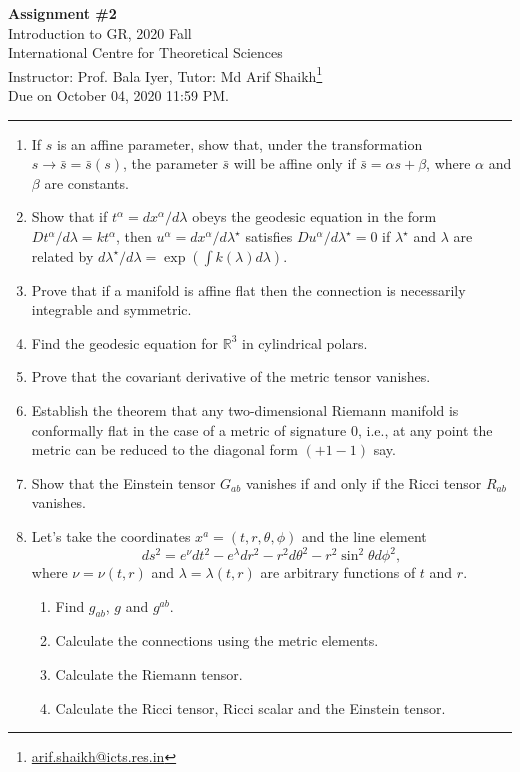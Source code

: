\documentclass{article}
\begin{document}
\begin{center}
  {\bfseries Assignment \#2}\\
  Introduction to GR, 2020 Fall\\
  International Centre for Theoretical Sciences\\
  Instructor: Prof. Bala Iyer, Tutor: Md Arif Shaikh\footnote{\href{mailto: arif.shaikh@icts.res.in}{arif.shaikh@icts.res.in}}\\
  Due on October 04, 2020 11:59 PM.
\end{center}
\hrule

\begin{enumerate}
\item If $s$ is an affine parameter, show that, under the transformation $s\to \bar{s} = \bar{s}(s)$, the parameter $\bar{s}$ will be affine only if $\bar{s} = \alpha s + \beta$, where $\alpha$ and $\beta$ are constants.

\item Show that if $t^\alpha = dx^\alpha/d\lambda$ obeys the geodesic equation in the form $Dt^\alpha/d\lambda = kt^\alpha$, then $u^\alpha = dx^\alpha/d\lambda^\star$ satisfies $Du^\alpha/d\lambda^\star = 0$ if $\lambda^\star$ and $\lambda$ are related by $d\lambda^\star/d\lambda = \exp(\int k (\lambda) d\lambda)$.

\item Prove that if a manifold is affine  flat then the connection is necessarily integrable and symmetric.

\item Find the geodesic equation for $\mathbb{R}^3$ in cylindrical polars.

\item Prove that the covariant derivative of the metric tensor vanishes.

\item Establish the theorem that any two-dimensional Riemann  manifold is conformally flat in the case of a metric of signature 0, i.e., at any point the metric can be reduced to the diagonal form $(+1 -1 )$ say.

\item Show that the Einstein tensor $G_{ab}$ vanishes if and only if the Ricci tensor $R_{ab}$ vanishes.

\item Let's take the coordinates $x^a = (t, r, \theta, \phi)$ and the line element
  \begin{equation}
    \label{eq:line-element}
    ds^2 = e^\nu dt^2 - e^\lambda dr^2 - r^2d\theta^2 - r^2\sin^2\theta d\phi^2,
  \end{equation}
  where $\nu = \nu(t, r)$ and $\lambda = \lambda(t, r)$ are arbitrary functions of $t$ and $r$.
  \begin{enumerate}
  \item Find $g_{ab}$, $g$ and $g^{ab}$.
  \item Calculate the connections using the metric elements.
  \item Calculate the Riemann tensor.
  \item Calculate the Ricci tensor, Ricci scalar and the Einstein tensor.
  \end{enumerate}


\end{enumerate}
\end{document}
